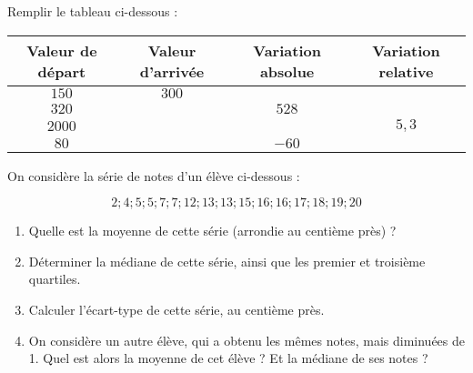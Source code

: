 \documentclass[
	classe=$2^{de}$,
	headerTitle=Évaluation\space Chapitre\space 4
]{évaluation}
\begin{document}
\begin{exercice}[4]
	Remplir le tableau ci-dessous :

	\begin{center}
		\begin{tabular}{|c|c|c|c|}
			\hline
			Valeur de départ & Valeur d'arrivée     & Variation absolue    & Variation relative   \\ \hline
			$150$            & $300$                & \correction{$150$}   & \correction{1}       \\ \hline
			$320$            & \correction{$848$}   & $528$                & \correction{$1,65$}  \\ \hline
			$2000$           & \correction{$12600$} & \correction{$10600$} & $5,3$                \\ \hline
			$80$             & \correction{$20$}    & $-60$                & \correction{$-0,75$} \\ \hline
		\end{tabular}
	\end{center}
\end{exercice}

\begin{exercice}[6]

	On considère la série de notes d'un élève ci-dessous :

	$$ 2; 4; 5; 5; 7; 7; 12; 13; 13; 15; 16; 16; 17; 18; 19; 20 $$

	\begin{enumerate}
		\item Quelle est la moyenne de cette série (arrondie au centième près) ? 
		\item Déterminer la médiane de cette série, ainsi que les premier et troisième quartiles.   
		\item Calculer l'écart-type de cette série, au centième près. 
		\item On considère un autre élève, qui a obtenu les mêmes notes, mais diminuées de 1. Quel est alors la moyenne de cet élève ? Et la médiane de ses notes ?
	\end{enumerate}
\end{exercice}
\end{document}
